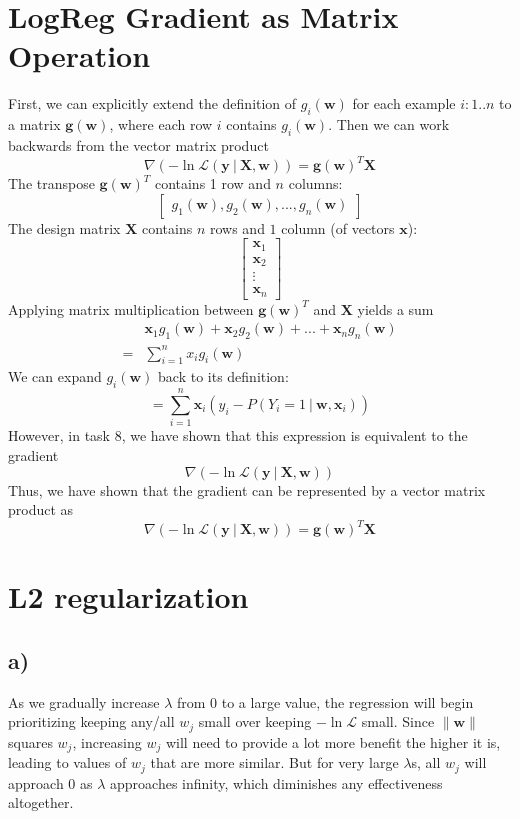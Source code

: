 \documentclass{article}
\renewcommand{\vec}[1]{%
	\mathbf{#1}%
}
\newcommand{\gv}{%
	\:|\:
}
\begin{document}
	
	\section{LogReg Gradient as Matrix Operation}
	First, we can explicitly extend the definition of $g_i(\vec{w})$ for each example $i : 1..n$ to a matrix $\vec{g}(\vec{w})$, where each row $i$ contains $g_i(\vec{w})$. Then we can work backwards from the vector matrix product
	\[ \nabla(-\ln\mathcal{L}(\vec{y}\gv\vec{X},\vec{w})) = \vec{g}(\vec{w})^T \vec{X} \] 
	The transpose $\vec{g}(\vec{w})^T$ contains 1 row and $n$ columns:
	\[ \begin{bmatrix} g_1(\vec{w}), g_2(\vec{w}), ..., g_n(\vec{w}) \end{bmatrix} \]
	The design matrix $\vec{X}$ contains $n$ rows and $1$ column (of vectors $\vec{x}$):
	\[\begin{bmatrix}
		\vec{x}_1\\
		\vec{x}_2\\
		\vdots \\
		\vec{x}_n
	\end{bmatrix}\]
	Applying matrix multiplication between $\vec{g}(\vec{w})^T$ and $\vec{X}$ yields a sum
	\begin{align*}
		 & \vec{x}_1g_1(\vec{w}) + \vec{x}_2g_2(\vec{w}) + ... + \vec{x}_ng_n(\vec{w})\\
		=& \sum_{i=1}^n x_ig_i(\vec{w})
	\end{align*}
	We can expand $g_i(\vec{w})$ back to its definition:
	\[ = \sum_{i=1}^n \vec{x}_i(y_i - P(Y_i = 1\gv \vec{w},\vec{x}_i)) \]
	However, in task 8, we have shown that this expression is equivalent to the gradient
	\[ \nabla(-\ln\mathcal{L}(\vec{y}\gv\vec{X},\vec{w}))\]
	Thus, we have shown that the gradient can be represented by a vector matrix product as
	\[ \nabla(-\ln\mathcal{L}(\vec{y}\gv\vec{X},\vec{w})) = \vec{g}(\vec{w})^T \vec{X} \]
	
	\section{L2 regularization}
	\subsection*{a)}
	As we gradually increase $\lambda$ from 0 to a large value, the regression will begin prioritizing keeping any/all $w_j$ small over keeping $-\ln\mathcal{L}$ small. Since $\|\vec{w}\|$ squares $w_j$, increasing $w_j$ will need to provide a lot more benefit the higher it is, leading to values of $w_j$ that are more similar. But for very large $\lambda$s, all $w_j$ will approach 0 as $\lambda$ approaches infinity, which diminishes any effectiveness altogether.
\end{document}
